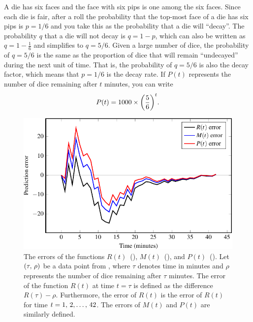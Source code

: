 \documentclass[a4paper,oneside,12pt]{article}
\begin{document}
\begin{problem}
{\begin{solution}
A die has six faces and the face with six pips is one among the six
faces.  Since each die is fair, after a roll the probability that the
top-most face of a die has six pips is $p = 1 / 6$ and you take this
as the probability that a die will ``decay''.  The probability $q$
that a die will not decay is $q = 1 - p$, which can also be written as
$q = 1 - \frac{1}{6}$ and simplifies to $q = 5 / 6$.  Given a large
number of dice, the probability of $q = 5 / 6$ is the same as the
proportion of dice that will remain ``undecayed'' during the next unit
of time.  That is, the probability of $q = 5 / 6$ is also the decay
factor, which means that $p = 1 / 6$ is the decay rate.  If $P(t)$
represents the number of dice remaining after $t$ minutes, you can
write
\begin{equation}
\label{eqn:radioactive_dice_probability}
P(t)
=
1000
\times
\parenthesis*{\frac{5}{6}}^t.
\end{equation}

\begin{figure}[!htbp]
\centering
\includegraphics[scale=1.1]{image/11/radioactive-dice-error.pdf}
\caption{%
  The errors of the functions
  $R(t)$~(),
  $M(t)$~(), and
  $P(t)$~().  Let
  $\left\lparen{\tau},\, {\rho}\right\rparen$ be a data point from
  , where $\tau$ denotes time in minutes
  and $\rho$ represents the number of dice remaining after $\tau$
  minutes.  The error of the function $R(t)$ at time $t = \tau$ is
  defined as the difference $R(\tau) - \rho$.  Furthermore, the error
  of $R(t)$ is the error of $R(t)$ for time $t = {1},\, {2}, \dots,\, {42}$.  The
  errors of $M(t)$ and $P(t)$ are similarly defined.
}
\label{fig:radioactive_dice_errors}
\end{figure}


\end{solution}}
\end{problem}
\end{document}
